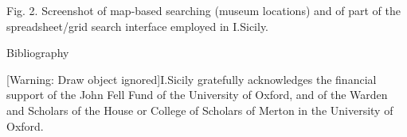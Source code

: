 \documentclass[amsthm,ebook]{saparticle}
\begin{document}
\bigskip

Fig. 2. Screenshot of map-based searching (museum locations) and of part of the spreadsheet/grid search interface
employed in I.Sicily.


\bigskip

Bibliography


\bigskip


\bigskip


\bigskip


\bigskip


\bigskip

[Warning: Draw object ignored]I.Sicily gratefully acknowledges the financial support of the John Fell Fund of the
University of Oxford, and of the Warden and Scholars of the House or College of Scholars of Merton in the University of
Oxford.




\end{document}
